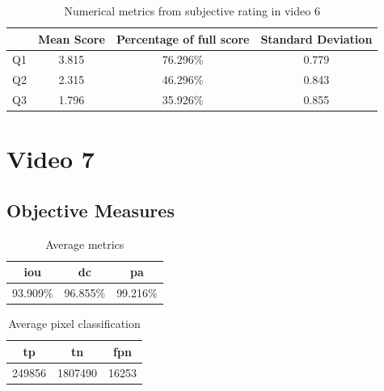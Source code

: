 \begin{table}[H]
    \centering
    \begin{tabular}{|c|c c c|} 
        \hline
           & \textbf{Mean Score} & \textbf{Percentage of full score} & \textbf{Standard Deviation} \\ [0.5ex] 
        \hline
        Q1 & 3.815 & 76.296\% & 0.779 \\ [1ex] 
        Q2 & 2.315 & 46.296\% & 0.843 \\ [1ex] 
        Q3 & 1.796 & 35.926\% & 0.855 \\ [1ex] 
        \hline
    \end{tabular}
    \caption{Numerical metrics from subjective rating in video 6}
    \label{tab:numerical_subj_vid6}
\end{table}



\section{Video 7}
\subsection{Objective Measures}

\begin{minipage}[c]{0.475\textwidth}
\begin{table}[H]
    \centering
    \begin{tabular}{||c c c||} 
        \hline
        \acrshort{iou} & \acrshort{dc} & \acrshort{pa} \\ [0.5ex] 
        \hline\hline
        93.909\% & 96.855\% & 99.216\% \\ [1ex] 
        \hline
    \end{tabular}
    \caption{Average metrics}
    \label{tab:metrics_video_7}
\end{table}
\end{minipage}
\begin{minipage}[c]{0.475\textwidth}
\begin{table}[H]
    \centering
    \begin{tabular}{||c c c||} 
        \hline
        \acrshort{tp} & \acrshort{tn} & \acrshort{fpn} \\ [0.5ex] 
        \hline\hline
        249856 & 1807490 & 16253 \\ [1ex] 
        \hline
    \end{tabular}
    \caption{Average pixel classification}
    \label{tab:pixels_video_7}
\end{table}
\end{minipage}

